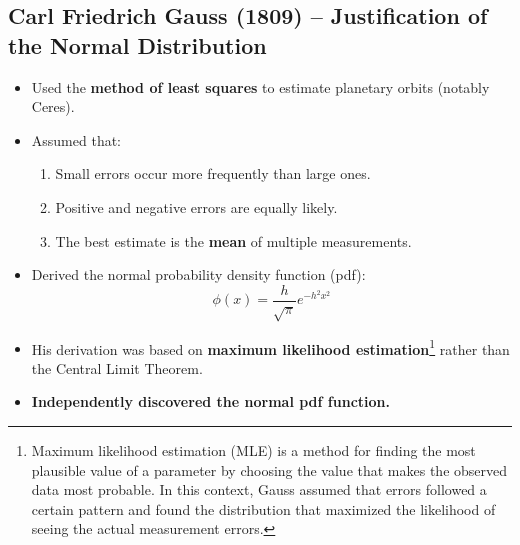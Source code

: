 \documentclass{article}
\begin{document}
\subsection{Carl Friedrich Gauss (1809) – Justification of the Normal Distribution}
\begin{itemize}
    \item Used the \textbf{method of least squares} to estimate planetary orbits (notably Ceres).
    \item Assumed that:
    \begin{enumerate}
        \item Small errors occur more frequently than large ones.
        \item Positive and negative errors are equally likely.
        \item The best estimate is the \textbf{mean} of multiple measurements.
    \end{enumerate}
    \item Derived the normal probability density function (pdf):
    \begin{equation}
    \phi(x) = \frac{h}{\sqrt{\pi}} e^{-h^2 x^2}
    \end{equation}
    \item His derivation was based on \textbf{maximum likelihood estimation}\footnote{Maximum likelihood estimation (MLE) is a method for finding the most plausible value of a parameter by choosing the value that makes the observed data most probable. In this context, Gauss assumed that errors followed a certain pattern and found the distribution that maximized the likelihood of seeing the actual measurement errors.} rather than the Central Limit Theorem.
    \item \textbf{Independently discovered the normal pdf function.}
\end{itemize}
\end{document}
